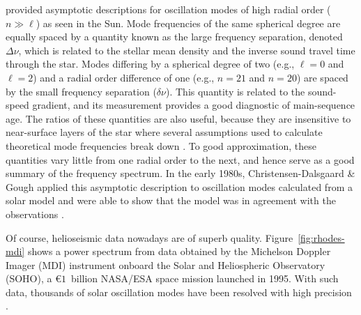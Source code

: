 \citet{1980ApJS...43..469T} provided asymptotic descriptions for oscillation modes of high radial order (${n\gg\ell}$) as seen in the Sun. 
Mode frequencies of the same spherical degree are equally spaced by a quantity known as the large frequency separation, denoted ${\Delta\nu}$, which is related to the stellar mean density and the inverse sound travel time through the star. 
Modes differing by a spherical degree of two (e.g., ${\ell=0}$ and ${\ell=2}$) and a radial order difference of one (e.g., ${n=21}$ and ${n=20}$) are spaced by the small frequency separation (${\delta\nu}$). 
This quantity is related to the sound-speed gradient, and its measurement provides a good diagnostic of main-sequence age. 
The ratios of these quantities are also useful, because they are insensitive to near-surface layers of the star where several assumptions used to calculate theoretical mode frequencies break down \citep[e.g.,][]{2003A&A...411..215R}. 
To good approximation, these quantities vary little from one radial order to the next, and hence serve as a good summary of the frequency spectrum. 
In the early 1980s, Christensen-Dalsgaard \& Gough applied this asymptotic description to oscillation modes calculated from a solar model and were able to show that the model was in agreement with the observations \citep[e.g.,][]{2002RvMP...74.1073C}. 

Of course, helioseismic data nowadays are of superb quality. 
Figure~\ref{fig:rhodes-mdi} shows a power spectrum from data obtained by the Michelson Doppler Imager (MDI) instrument onboard the Solar and Heliospheric Observatory (SOHO), a \euro$1$~billion NASA/ESA space mission launched in 1995. 
With such data, thousands of solar oscillation modes have been resolved with high precision \citep[e.g.,][]{1997SoPh..175..287R}. 

